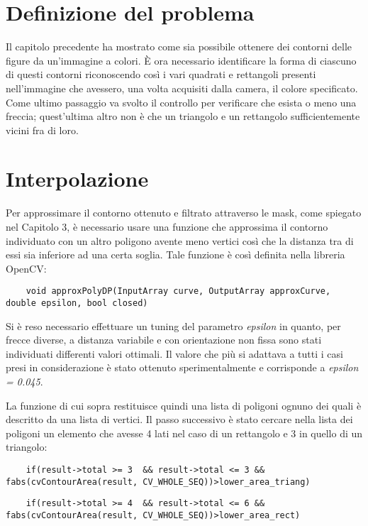 \section{Definizione del problema}
Il capitolo precedente ha mostrato come sia possibile ottenere dei contorni delle figure da un'immagine a colori.
È ora necessario identificare la forma di ciascuno di questi contorni riconoscendo così i vari quadrati e rettangoli presenti nell'immagine che avessero, una volta acquisiti dalla camera, il colore specificato. Come ultimo passaggio va svolto il controllo per verificare che esista o meno una freccia; quest'ultima altro non è che un triangolo e un rettangolo sufficientemente vicini fra di loro.

\section{Interpolazione}
Per approssimare il contorno ottenuto e filtrato attraverso le mask, come spiegato nel Capitolo 3, è necessario usare una funzione che approssima il contorno individuato con un altro poligono avente meno vertici così che la distanza tra di essi sia inferiore ad una certa soglia. Tale funzione è così definita nella libreria OpenCV:

\begin{lstlisting}
	void approxPolyDP(InputArray curve, OutputArray approxCurve, double epsilon, bool closed)
\end{lstlisting}

Si è reso necessario effettuare un tuning del parametro \textsl{epsilon} in quanto, per frecce diverse, a distanza variabile e con orientazione non fissa sono stati individuati differenti valori ottimali. Il valore che più si adattava a tutti i casi presi in considerazione è stato ottenuto sperimentalmente e corrisponde a \textsl{epsilon = 0.045}.

La funzione di cui sopra restituisce quindi una lista di poligoni ognuno dei quali è descritto da una lista di vertici.
Il passo successivo è stato cercare nella lista dei poligoni un elemento che avesse 4 lati nel caso di un rettangolo e 3 in quello di un triangolo:

\begin{lstlisting}
	if(result->total >= 3  && result->total <= 3 && fabs(cvContourArea(result, CV_WHOLE_SEQ))>lower_area_triang)
\end{lstlisting}
\begin{lstlisting}
	if(result->total >= 4  && result->total <= 6 && fabs(cvContourArea(result, CV_WHOLE_SEQ))>lower_area_rect)
\end{lstlisting}


